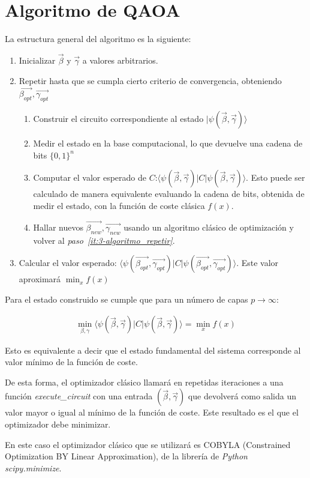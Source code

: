 \section{Algoritmo de QAOA}
La estructura general del algoritmo es la siguiente:
\begin{enumerate}
\item Inicializar $\vec{\beta}$ y $\vec{\gamma}$ a valores arbitrarios.
\item\label{it:3-algoritmo_repetir}
  Repetir hasta que se cumpla cierto criterio de convergencia, obteniendo $\vec{\beta_{opt}}, \vec{\gamma_{opt}}$
  \begin{enumerate}
  \item Construir el circuito correspondiente al estado $\lvert\psi(\vec{\beta}, \vec{\gamma})\rangle$
  \item Medir el estado en la base computacional, lo que devuelve una cadena de bits ${\{0, 1\}}^n$
  \item Computar el valor esperado de $C$:\@$\langle \psi(\vec{\beta}, \vec{\gamma}) \rvert C \lvert \psi(\vec{\beta}, \vec{\gamma}) \rangle$.
    Esto puede ser calculado de manera equivalente evaluando la cadena de bits, obtenida de medir el estado, con la función de coste clásica $f(x)$.
  \item Hallar nuevos \(\vec{\beta_{new}}, \vec{\gamma_{new}}\) usando un algoritmo clásico de optimización y volver al \textit{paso~\ref{it:3-algoritmo_repetir}}.
  \end{enumerate}
\item Calcular el valor esperado: \( \langle \psi(\vec{\beta_{opt}}, \vec{\gamma_{opt}}) \rvert C \lvert \psi(\vec{\beta_{opt}}, \vec{\gamma_{opt}}) \rangle \). Este valor aproximará \(\min_{x}f(x)\)
\end{enumerate}

Para el estado construido se cumple que para un número de capas \(p \rightarrow \infty\):

\begin{align*}
  \min_{\beta, \gamma} \langle \psi(\vec{\beta}, \vec{\gamma}) \rvert C \lvert \psi(\vec{\beta}, \vec{\gamma}) \rangle = \min_{x} f(x)
\end{align*}

Esto es equivalente a decir que el estado fundamental del sistema corresponde al valor mínimo de la función de coste.  %

De esta forma, el optimizador clásico llamará en repetidas iteraciones a una función \textit{execute\_circuit} con una entrada \((\vec{\beta}, \vec{\gamma})\) que devolverá como salida un valor mayor o igual al mínimo de la función de coste. Este resultado es el que el optimizador debe minimizar.

En este caso el optimizador clásico que se utilizará es COBYLA (Constrained Optimization BY Linear Approximation), de la librería de \textit{Python} \textit{scipy.minimize}.  %

